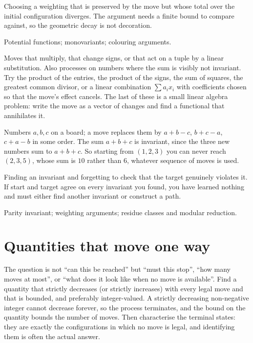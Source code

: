\begin{trap}
Choosing a weighting that is preserved by the move but whose total over the initial configuration diverges. The argument needs a finite bound to compare against, so the geometric decay is not decoration.
\end{trap}

\begin{seealsob}Potential functions; monovariants; colouring arguments.\end{seealsob}

\cue Moves that multiply, that change signs, or that act on a tuple by a linear substitution. Also processes on numbers where the sum is visibly not invariant.
\method Try the product of the entries, the product of the signs, the sum of squares, the greatest common divisor, or a linear combination $\sum a_{i}x_{i}$ with coefficients chosen so that the move's effect cancels. The last of these is a small linear algebra problem: write the move as a vector of changes and find a functional that annihilates it.

\begin{worked}
Numbers $a,b,c$ on a board; a move replaces them by $a+b-c$, $b+c-a$, $c+a-b$ in some order. The sum $a+b+c$ is invariant, since the three new numbers sum to $a+b+c$. So starting from $(1,2,3)$ you can never reach $(2,3,5)$, whose sum is $10$ rather than $6$, whatever sequence of moves is used.
\end{worked}

\begin{trap}
Finding an invariant and forgetting to check that the target genuinely violates it. If start and target agree on every invariant you found, you have learned nothing and must either find another invariant or construct a path.
\end{trap}

\begin{seealsob}Parity invariant; weighting arguments; residue classes and modular reduction.\end{seealsob}

\section{Quantities that move one way}

\cue The question is not ``can this be reached'' but ``must this stop'', ``how many moves at most'', or ``what does it look like when no move is available''.
\method Find a quantity that strictly decreases (or strictly increases) with every legal move and that is bounded, and preferably integer-valued. A strictly decreasing non-negative integer cannot decrease forever, so the process terminates, and the bound on the quantity bounds the number of moves. Then characterise the terminal states: they are exactly the configurations in which no move is legal, and identifying them is often the actual answer.

